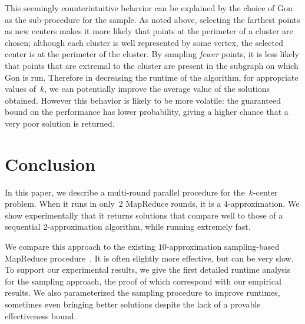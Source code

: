 \documentclass[11pt]{article}
\newcommand{\ene}{{\sc EIM}\xspace}
\newcommand{\gon}{{\sc Gon}\xspace}
\begin{document}
 
This seemingly counterintuitive behavior can be explained by the choice
of \gon as the sub-procedure for the sample. 
As noted above,
selecting the farthest points as new centers makes it more likely that points
at the perimeter of a cluster are chosen; although each cluster is well
represented by some vertex, the selected center is at the perimeter of the cluster. 
By sampling \emph{fewer} points, it is less likely that points that are
extremal to the cluster are present in the subgraph on which
\gon is run.
Therefore in decreasing the runtime of the algorithm,
for appropriate values of~$k$,
we can potentially improve the average value of the solutions obtained.
However this behavior is likely to be more volatile:
the guaranteed bound on the performance has lower probability,
giving a higher chance that a very poor solution is returned.






\section{Conclusion}
In this paper, we describe a multi-round parallel procedure for the~$k$-center
problem.
When it runs in only~$2$ MapReduce rounds, it is  a $4$-approximation. 
We show experimentally that it returns solutions that compare well
to those of a sequential $2$-approximation algorithm, while running extremely
fast. 

We compare this approach to the existing $10$-approximation
sampling-based MapReduce procedure~\cite{ene2011fast}.
It is often slightly more effective, but can be very slow.
To support our experimental results, we give the first detailed runtime analysis for the sampling approach, the proof of which correspond with our empirical results.
We also parameterized the
sampling procedure to improve runtimes, sometimes even bringing better
solutions despite the lack of a provable effectiveness bound.



\begin{figure*}[!t]
\vspace{-7mm}
\centerline 
\hfil
{}
\hfil
{}
\caption{\small Runtimes in seconds for fixed~$k$ over values of~$n$ ranging
from $10,\!000$ to $1,\!000,\!000$.
For sufficiently small values of~$n$ relative to~$k$, \ene behaves identically to \gon.
The is caused by the condition on the while loop: if~$k$ is large enough, the condition is never met and no sampling occurs,
so \gon is run on the entire data set.}
\label{fig_sim}
\end{figure*}
\end{document}
